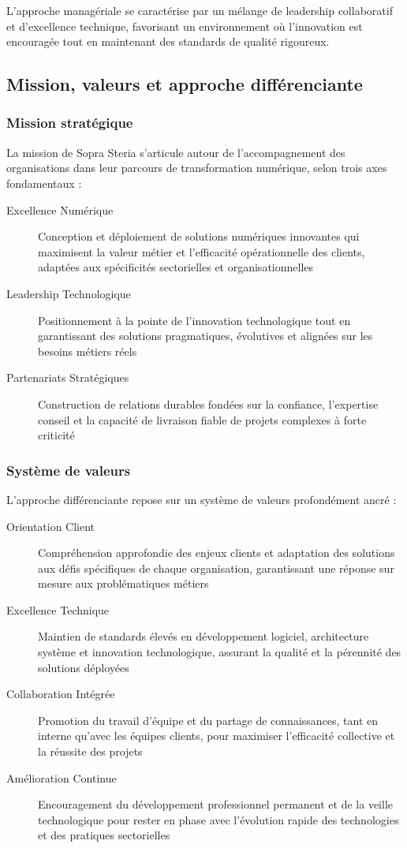 L'approche managériale se caractérise par un mélange de leadership collaboratif et d'excellence technique, favorisant un environnement où l'innovation est encouragée tout en maintenant des standards de qualité rigoureux.

\subsection{Mission, valeurs et approche différenciante}

\subsubsection{Mission stratégique}

La mission de Sopra Steria s'articule autour de l'accompagnement des organisations dans leur parcours de transformation numérique, selon trois axes fondamentaux :

\begin{description}
    \item[Excellence Numérique] Conception et déploiement de solutions numériques innovantes qui maximisent la valeur métier et l'efficacité opérationnelle des clients, adaptées aux spécificités sectorielles et organisationnelles
    \item[Leadership Technologique] Positionnement à la pointe de l'innovation technologique tout en garantissant des solutions pragmatiques, évolutives et alignées sur les besoins métiers réels
    \item[Partenariats Stratégiques] Construction de relations durables fondées sur la confiance, l'expertise conseil et la capacité de livraison fiable de projets complexes à forte criticité
\end{description}

\subsubsection{Système de valeurs}

L'approche différenciante repose sur un système de valeurs profondément ancré :

\begin{description}
    \item[Orientation Client] Compréhension approfondie des enjeux clients et adaptation des solutions aux défis spécifiques de chaque organisation, garantissant une réponse sur mesure aux problématiques métiers
    \item[Excellence Technique] Maintien de standards élevés en développement logiciel, architecture système et innovation technologique, assurant la qualité et la pérennité des solutions déployées
    \item[Collaboration Intégrée] Promotion du travail d'équipe et du partage de connaissances, tant en interne qu'avec les équipes clients, pour maximiser l'efficacité collective et la réussite des projets
    \item[Amélioration Continue] Encouragement du développement professionnel permanent et de la veille technologique pour rester en phase avec l'évolution rapide des technologies et des pratiques sectorielles
\end{description}

